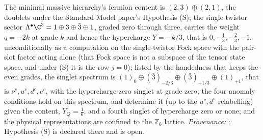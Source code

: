 The minimal massive hierarchy's fermion content is $(2,3) \oplus (2,1)$, the doublets under the Standard-Model paper's Hypothesis (S); the single-twistor sector $\Lambda^{\bullet}\C^{3} = 1 \oplus 3 \oplus \bar{3} \oplus 1$, graded zero through three, carries the weight $q = -2k$ at grade $k$ and hence the hypercharge $Y = -k/3$, that is $0, -\tfrac13, -\tfrac23, -1$, unconditionally as a computation on the single-twistor Fock space with the pair-slot factor acting alone (that Fock space is not a subspace of the tensor state space, and under (S) it is the row $j = 0$); listed by the handedness that keeps the even grades, the singlet spectrum is $(1)_{0} \oplus (\bar{3})_{-2/3} \oplus (\bar{3})_{+1/3} \oplus (1)_{+1}$, that is $\nu^{c}, u^{c}, d^{c}, e^{c}$, with the hypercharge-zero singlet at grade zero; the four anomaly conditions hold on this spectrum, and determine it (up to the $u^{c}, d^{c}$ relabelling) given the content, $Y_{Q} = \tfrac16$, and a fourth singlet of hypercharge zero or none; and the physical representations are confined to the $\mathbb{Z}_{6}$ lattice. \emph{Provenance:} \cite[Prop.~5.1, Prop.~5.3, Thm.~5.5, Thm.~4.2]{ButlerT12}; Hypothesis (S) is declared there and is open.
